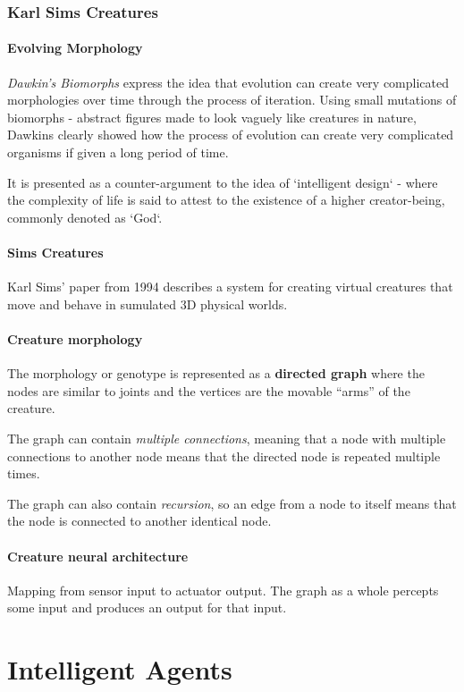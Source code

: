 \subsubsection{Karl Sims Creatures}

\paragraph{Evolving Morphology} \textit{Dawkin's Biomorphs} express the idea that evolution can create very complicated morphologies over time through the process of iteration. Using small mutations of biomorphs - abstract figures made to look vaguely like creatures in nature, Dawkins clearly showed how the process of evolution can create very complicated organisms if given a long period of time.

It is presented as a counter-argument to the idea of `intelligent design` - where the complexity of life is said to attest to the existence of a higher creator-being, commonly denoted as `God`.

\paragraph{Sims Creatures} Karl Sims' paper from 1994 describes a system for creating virtual creatures that move and behave in sumulated 3D physical worlds.

\paragraph{Creature morphology} The morphology or genotype is represented as a \textbf{directed graph} where the nodes are similar to joints and the vertices are the movable ``arms'' of the creature.

The graph can contain \textit{multiple connections}, meaning that a node with multiple connections to another node means that the directed node is repeated multiple times.

The graph can also contain \textit{recursion}, so an edge from a node to itself means that the node is connected to another identical node.

\paragraph{Creature neural architecture} Mapping from sensor input to actuator output. The graph as a whole percepts some input and produces an output for that input.


\section{Intelligent Agents}


